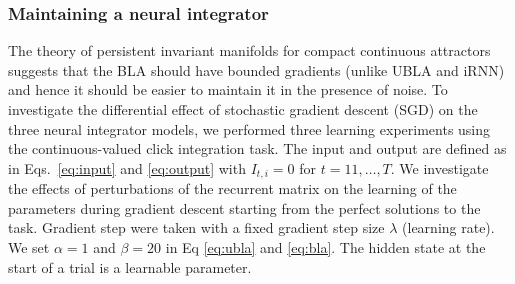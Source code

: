 \documentclass{article} %
\newcounter{ct}
\theoremstyle{definition}
\theoremstyle{remark}
\begin{document}
\subsubsection{Maintaining a neural integrator}\label{sec:exp:maintaining}
The theory of persistent invariant manifolds for compact continuous attractors suggests that the BLA should have bounded gradients (unlike UBLA and iRNN) and hence it should be easier to maintain it in the presence of noise.
To investigate the differential effect of stochastic gradient descent (SGD) on the three neural integrator models, we performed three learning experiments using the continuous-valued click integration task.
The input and output are defined as in Eqs.~\ref{eq:input} and \ref{eq:output} with $I_{t,i}=0$ for $t=11,\dots,T$.
We investigate the effects of perturbations of the recurrent matrix on the learning of the parameters during gradient descent starting from the perfect solutions to the task.  Gradient step were taken with a fixed gradient step size $\lambda$ (learning rate).
 We set $\alpha=1$ and $\beta=20$ in Eq \ref{eq:ubla} and \ref{eq:bla}. The hidden state at the start of a trial is a learnable parameter. 
\end{document}
